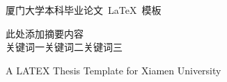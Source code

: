 
\pagestyle{fancy}
     \fancyhf{}
	 \fancyhead[CO]{\normalfont\small\rmfamily\nouppercase{\leftmark}}
     \fancyfoot[C]{-\,\thepage\,-}
     \renewcommand{\headrulewidth}{0.4pt}
     
     
\begin{cnabstract}
\begin{center}
		\heiti {}厦门大学本科毕业论文~\LaTeX~模板 \\[2em]
	\end{center}
\begin{flushleft}
\heiti[摘要]\quad 
\songti{}此处添加摘要内容
\\[2em]\heiti[关键词]\quad 
\songti{}关键词一\qquad 关键词二\qquad 关键词三\qquad 
\end{flushleft}
\end{cnabstract}



\begin{enabstract}
\begin{center}
		\textsf{A LATEX Thesis Template for Xiamen University} \\[2em]
	\end{center}
\begin{flushleft}
\end{flushleft}
\end{enabstract}



